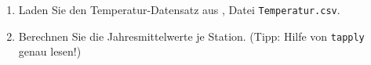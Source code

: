 \documentclass[]{book}
\providecommand{\tightlist}{%
  \setlength{\itemsep}{0pt}\setlength{\parskip}{0pt}}
\begin{document}
\begin{enumerate}
\def\labelenumi{\arabic{enumi}.}
\tightlist
\item
  Laden Sie den Temperatur-Datensatz aus \citet{Zuur2009a}, Datei \texttt{Temperatur.csv}.
\item
  Berechnen Sie die Jahresmittelwerte je Station. (Tipp: Hilfe von \texttt{tapply} genau lesen!)
\end{enumerate}

\hypertarget{refs}{}


\end{document}
